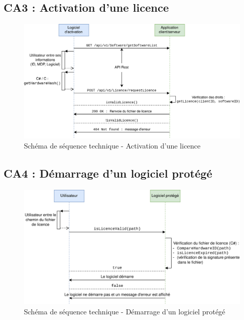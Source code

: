 \subsection{CA3 : Activation d'une licence}
\begin{figure}[!h]
    \centering
    \includegraphics[width=15cm]{../png/SSD-logiciel-activation.png}
    \caption{Schéma de séquence technique - Activation d'une licence}
\end{figure}

\subsection{CA4 : Démarrage d'un logiciel protégé}
\begin{figure}[!h]
    \centering
    \includegraphics[width=15cm]{../png/SSD-demarrage-logiciel.png}
    \caption{Schéma de séquence technique - Démarrage d'un logiciel protégé}
\end{figure}
\newpage

